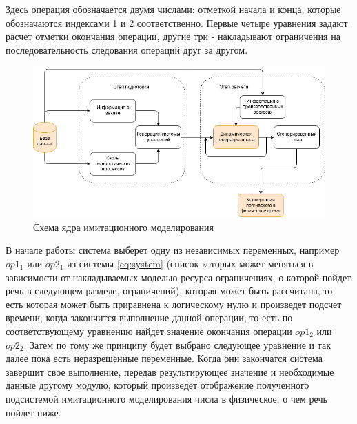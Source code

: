 \indent Здесь операция обозначается двумя числами: отметкой начала и конца, которые обозначаются индексами 1 и 2 соответственно.
Первые четыре уравнения задают расчет отметки окончания операции, другие три - накладывают ограничения на последовательность следования операций друг за другом.

\begin{figure}[ht]
	\centering
	\includegraphics{pics/imcoreDataflow.png}
	\caption{Схема ядра имитационного моделирования}
	\label{fig:imcoreFlow}
\end{figure}

\indent В начале работы система выберет одну из независимых переменных, например $op1_1$ или $op2_1$ из системы \ref{eq:system} (список которых может меняться в зависимости от накладываемых моделью ресурса ограничениях, о которой пойдет речь в следующем разделе, ограничений), которая может быть рассчитана, то есть которая может быть приравнена к логическому нулю и произведет подсчет времени, когда закончится выполнение данной операции, то есть по соответствующему уравнению найдет значение окончания операции $op1_2$ или $op2_2$.
Затем по тому же принципу будет выбрано следующее уравнение и так далее пока есть неразрешенные переменные.
Когда они закончатся система завершит свое выполнение, передав результирующее значение и необходимые данные другому модулю, который произведет отображение полученного подсистемой имитационного моделирования числа в физическое, о чем речь пойдет ниже.